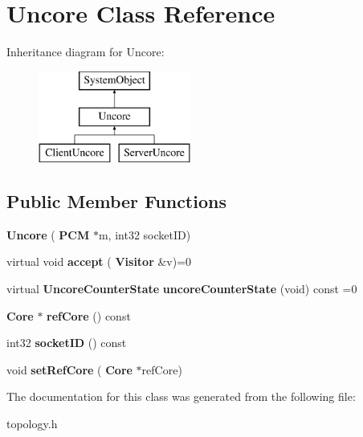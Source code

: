 \section{Uncore Class Reference}
\label{classUncore}
Inheritance diagram for Uncore\+:\begin{figure}[H]
\begin{center}
\leavevmode
\includegraphics[height=3.000000cm]{classUncore}
\end{center}
\end{figure}
\subsection*{Public Member Functions}
\begin{DoxyCompactItemize}
\item 
\mbox{\label{classUncore_aaec1cc97f2b1d82af6573ff9a25ecce6}} 
{\bfseries Uncore} (\textbf{ P\+CM} $\ast$m, int32 socket\+ID)
\item 
\mbox{\label{classUncore_ab84d5ae52a32984ae778da52cef06bc7}} 
virtual void {\bfseries accept} (\textbf{ Visitor} \&v)=0
\item 
\mbox{\label{classUncore_abf7ad6707c4a183e52cbb0ef0d78b1c5}} 
virtual \textbf{ Uncore\+Counter\+State} {\bfseries uncore\+Counter\+State} (void) const =0
\item 
\mbox{\label{classUncore_a5c82cc94afff352bf8ba1ac9d2e1109b}} 
\textbf{ Core} $\ast$ {\bfseries ref\+Core} () const
\item 
\mbox{\label{classUncore_af3b31dcfa96ded0d438929c25118ee20}} 
int32 {\bfseries socket\+ID} () const
\item 
\mbox{\label{classUncore_a4f3a5f7a3e7df2fbef55916f622846da}} 
void {\bfseries set\+Ref\+Core} (\textbf{ Core} $\ast$ref\+Core)
\end{DoxyCompactItemize}


The documentation for this class was generated from the following file\+:\begin{DoxyCompactItemize}
\item 
topology.\+h\end{DoxyCompactItemize}
